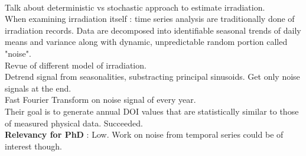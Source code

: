 \documentclass[]{report}
\begin{document}
\begin{itemize}
	\\Talk about deterministic vs stochastic approach to estimate irradiation.
	\\ When examining irradiation itself : time series analysis are traditionally done of irradiation records. Data are decomposed into identifiable seasonal trends of daily means and variance along with dynamic, unpredictable random portion called "noise".
	\\Revue of different model of irradiation.
	\\Detrend signal from seasonalities, substracting principal sinusoids. Get only noise signals at the end.
	\\Fast Fourier Transform on noise signal of every year.
	\\ Their goal is to generate annual DOI values that are statistically similar to those of measured physical data. Succeeded.
	\\\textbf{Relevancy for PhD} : Low. Work on noise from temporal series could be of interest though.
\end{itemize}
\end{document}
